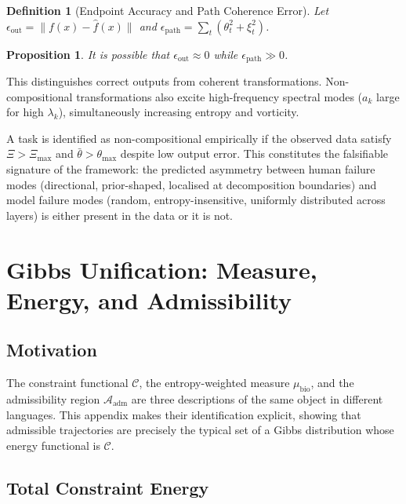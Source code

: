 \documentclass[12pt, a4paper]{article}
\newtheorem{definition}[theorem]{Definition}
\newtheorem{proposition}[theorem]{Proposition}
\theoremstyle{remark}
\theoremstyle{definition}
\begin{document}
\begin{definition}[Endpoint Accuracy and Path Coherence Error]
Let $\epsilon_{\mathrm{out}} = \|f(x) - \hat{f}(x)\|$ and
$\epsilon_{\mathrm{path}} = \sum_t (\theta_t^2 + \xi_t^2)$.
\end{definition}

\begin{proposition}
It is possible that $\epsilon_{\mathrm{out}} \approx 0$ while $\epsilon_{\mathrm{path}} \gg 0$.
\end{proposition}

This distinguishes correct outputs from coherent transformations.  Non-compositional
transformations also excite high-frequency spectral modes ($a_k$ large for high
$\lambda_k$), simultaneously increasing entropy and vorticity.

A task is identified as non-compositional empirically if the observed data satisfy
$\Xi > \Xi_{\max}$ and $\bar\theta > \theta_{\max}$ despite low output error.  This
constitutes the falsifiable signature of the framework: the predicted asymmetry between
human failure modes (directional, prior-shaped, localised at decomposition boundaries)
and model failure modes (random, entropy-insensitive, uniformly distributed across layers)
is either present in the data or it is not.

\section{Gibbs Unification: Measure, Energy, and Admissibility}
\label{app:gibbs}

\subsection{Motivation}

The constraint functional $\mathcal{C}$, the entropy-weighted measure $\mu_{\mathrm{bio}}$,
and the admissibility region $\mathcal{A}_{\mathrm{adm}}$ are three descriptions of the
same object in different languages.  This appendix makes their identification explicit,
showing that admissible trajectories are precisely the typical set of a Gibbs distribution
whose energy functional is $\mathcal{C}$.

\subsection{Total Constraint Energy}
\end{document}
